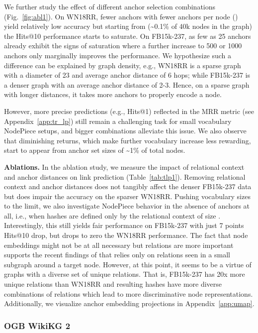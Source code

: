 \documentclass{article} \usepackage{iclr2022_conference,times}
\begin{document}
We further study the effect of different anchor selection combinations~ (Fig.~\ref{fig:abl1}). 
On WN18RR, fewer anchors with fewer anchors per node () yield relatively low accuracy but starting from  (\textasciitilde{}0.1\% of 40k nodes in the graph) the Hits@10 performance starts to saturate. 
On FB15k-237, as few as 25 anchors already exhibit the signs of saturation where a further increase to 500 or 1000 anchors only marginally improves the performance. 
We hypothesize such a difference can be explained by graph density, e.g., WN18RR is a sparse graph with a diameter of 23 and average anchor distance of 6 hops; while FB15k-237 is a denser graph with an average anchor distance of 2-3.  
Hence, on a sparse graph with longer distances, it takes more anchors to properly encode a node.

However, more precise predictions (e.g., Hits@1) reflected in the MRR metric (see Appendix~\ref{app:tr_lp}) still remain a challenging task for small vocabulary NodePiece setups, and bigger  combinations alleviate this issue.
We also observe that diminishing returns, which make further vocabulary increase less rewarding, start to appear from anchor set sizes of \textasciitilde{}1\% of total nodes.




\textbf{Ablations.}
In the ablation study, we measure the impact of relational context and anchor distances on link prediction (Table~\ref{tab:tlp1}).
Removing relational context and anchor distances does not tangibly affect the denser FB15k-237 data but does impair the accuracy on the sparser WN18RR. 
Pushing vocabulary sizes to the limit, we also investigate NodePiece behavior in the absence of anchors at all, i.e., when hashes are defined only by the relational context of size .
Interestingly, this still yields fair performance on FB15k-237 with just 7 points Hits@10 drop, but drops to zero the WN18RR performance. 
The fact that node embeddings might not be at all necessary but relations are more important supports the recent findings of \citet{DBLP:conf/icml/TeruDH20} that relies only on relations seen in a small subgraph around a target node.
However, at this point, it seems to be a virtue of graphs with a diverse set of unique relations. 
That is, FB15k-237 has 20x more unique relations than WN18RR and resulting hashes have more diverse combinations of relations which lead to more discriminative node representations. 
Additionally, we visualize anchor embedding projections in Appendix~\ref{app:umap}.

\subsubsection{OGB WikiKG 2}
\end{document}
